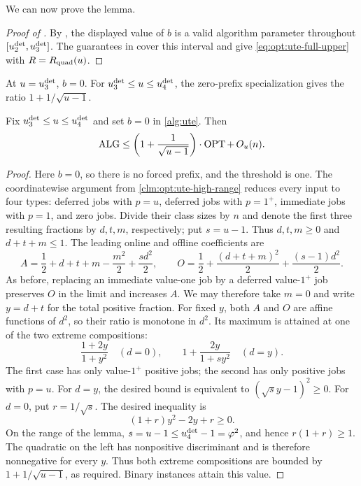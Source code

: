 We can now prove the lemma.

\begin{proof}[Proof of ]
By , the displayed value of $b$ is a valid
algorithm parameter throughout $[u_{2}^{\mathrm{det}},u_{3}^{\mathrm{det}}]$.  The guarantees in
 cover this interval and
give \cref{eq:opt:ute-full-upper} with $R=R_{\mathrm{quad}}(u)$.
\end{proof}

At $u=u_{3}^{\mathrm{det}}$, $b=0$.  For
$u_{3}^{\mathrm{det}}\le u\le u_{4}^{\mathrm{det}}$, the zero-prefix specialization gives the
ratio $1+1/\sqrt{u-1}$.

\begin{lemma}
\label{lem:opt:zero-prefix}
Fix $u_{3}^{\mathrm{det}}\le u\le u_{4}^{\mathrm{det}}$ and set $b=0$ in \cref{alg:ute}.  Then
\begin{equation}
 \operatorname{ALG}\le\left(1+\frac1{\sqrt{u-1}}\right)\cdot\operatorname{OPT}+\,O_u(n).
 \label{eq:opt:zero-prefix-guarantee}
\end{equation}
\end{lemma}

\begin{proof}
Here $b=0$, so there is no forced prefix, and the threshold is one.  The
coordinatewise argument from \cref{clm:opt:ute-high-range} reduces every
input to four types: deferred jobs with $p=u$, deferred jobs with $p=1^+$,
immediate jobs with $p=1$, and zero jobs.  Divide their class sizes by $n$
and denote the first three resulting fractions by $d,t,m$, respectively;
put $s=u-1$.  Thus
$d,t,m\ge0$ and $d+t+m\le1$.  The leading online and offline coefficients
are
\begin{equation}
 A=\frac12+d+t+m-\frac{m^2}{2}+\frac{s d^2}{2},
 \qquad
 O=\frac12+\frac{(d+t+m)^2}{2}+\frac{(s-1)d^2}{2}.
\end{equation}
As before, replacing an immediate value-one job by a deferred value-$1^+$
job preserves $O$ in the limit and increases $A$.  We may therefore take
$m=0$ and write $y=d+t$ for the total positive fraction.  For fixed $y$, both
$A$ and $O$ are affine functions of $d^2$, so their ratio is monotone in
$d^2$.  Its maximum is attained at one of the two extreme compositions:
\begin{equation}
 \frac{1+2y}{1+y^2}
 \quad(d=0),
 \qquad
 1+\frac{2y}{1+s y^2}
 \quad(d=y).
\end{equation}
The first case has only value-$1^+$ positive jobs; the second has only
positive jobs with $p=u$.
For $d=y$, the desired bound is equivalent to
$(\sqrt{s}y-1)^2\ge0$.  For $d=0$, put $r=1/\sqrt{s}$.  The desired
inequality is
\[
 (1+r)y^2-2y+r\ge0.
\]
On the range of the lemma, $s=u-1\le u_{4}^{\mathrm{det}}-1=\varphi^2$, and hence
$r(1+r)\ge1$.  The quadratic on the left has nonpositive discriminant and
is therefore nonnegative for every $y$.  Thus both extreme compositions are
bounded by $1+1/\sqrt{u-1}$, as required.  Binary instances attain this
value.
\end{proof}


